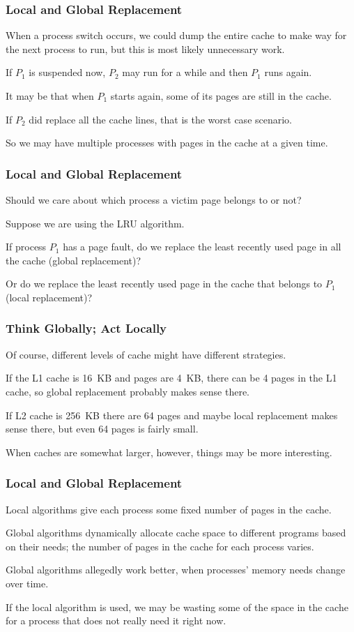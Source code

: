 \begin{frame}
\frametitle{Local and Global Replacement}

When a process switch occurs, we could dump the entire cache to make way for the next process to run, but this is most likely unnecessary work. 

If $P_{1}$ is suspended now, $P_{2}$ may run for a while and then $P_{1}$ runs again.

It may be that when $P_{1}$ starts again, some of its pages are still in the cache.

If $P_{2}$ did replace all the cache lines, that is the worst case scenario. 

So we may have multiple processes with pages in the cache at a given time.

\end{frame}

\begin{frame}
\frametitle{Local and Global Replacement}

Should we care about which process a victim page belongs to or not? 

Suppose we are using the LRU algorithm. 

If process $P_{1}$ has a page fault, do we replace the least recently used page in all the cache (global replacement)? 

Or do we replace the least recently used page in the cache that belongs to $P_{1}$ (local replacement)?


\end{frame}

\begin{frame}
\frametitle{Think Globally; Act Locally}

Of course, different levels of cache might have different strategies. 

If the L1 cache is 16~KB and pages are 4~KB, there can be 4 pages in the L1 cache, so global replacement probably makes sense there. 

If L2 cache is 256~KB there are 64 pages and maybe local replacement makes sense there, but even 64 pages is fairly small.

When caches are somewhat larger, however, things may be more interesting.

\end{frame}


\begin{frame}
\frametitle{Local and Global Replacement}

Local algorithms give each process some fixed number of pages in the cache. 

Global algorithms dynamically allocate cache space to different programs based on their needs; the number of pages in the cache for each process varies.

Global algorithms allegedly work better, when processes' memory needs change over time.

If the local algorithm is used, we may be wasting some of the space in the cache for a process that does not really need it right now. 

\end{frame}

